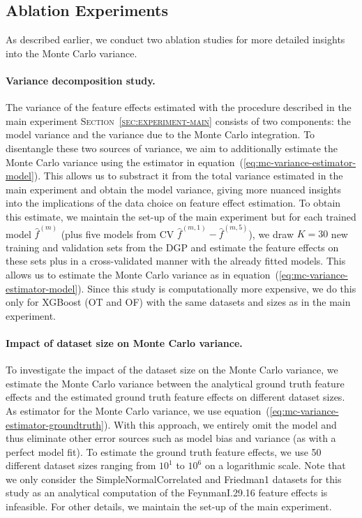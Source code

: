 \documentclass[runningheads]{llncs}
\begin{document}
\subsection{Ablation Experiments}\label{sec:experiment-ablation}

As described earlier, we conduct two ablation studies for more detailed
insights into the Monte Carlo variance.

\paragraph{Variance decomposition study.} The variance of the feature effects estimated with the procedure described in
the main experiment \textsc{Section~\ref{sec:experiment-main}} consists of two
components: the model variance and the variance due to the Monte Carlo
integration. To disentangle these two sources of variance, we aim to
additionally estimate the Monte Carlo variance using the estimator in
equation~(\ref{eq:mc-variance-estimator-model}). This allows us to substract it
from the total variance estimated in the main experiment and obtain the model
variance, giving more nuanced insights into the implications of the data choice
on feature effect estimation. To obtain this estimate, we maintain the set-up
of the main experiment but for each trained model $\hat f^{(m)}$ (plus five
models from CV $\hat f^{(m,1)} - \hat f^{(m,5)}$), we draw $K=30$ new training
and validation sets from the DGP and estimate the feature effects on these sets
plus in a cross-validated manner with the already fitted models. This allows us
to estimate the Monte Carlo variance as in
equation~(\ref{eq:mc-variance-estimator-model}). Since this study is
computationally more expensive, we do this only for XGBoost (OT and OF) with
the same datasets and sizes as in the main experiment.

\paragraph{Impact of dataset size on Monte Carlo variance.} To investigate the impact of the dataset size on the Monte Carlo variance, we
estimate the Monte Carlo variance between the analytical ground truth feature
effects and the estimated ground truth feature effects on different dataset
sizes. As estimator for the Monte Carlo variance, we use
equation~(\ref{eq:mc-variance-estimator-groundtruth}). With this approach, we
entirely omit the model and thus eliminate other error sources such as model
bias and variance (as with a perfect model fit). To estimate the ground truth
feature effects, we use 50 different dataset sizes ranging from $10^1$ to
$10^6$ on a logarithmic scale. Note that we only consider the
SimpleNormalCorrelated and Friedman1 datasets for this study as an analytical
computation of the FeynmanI.29.16 feature effects is infeasible. For other
details, we maintain the set-up of the main experiment.
\end{document}
